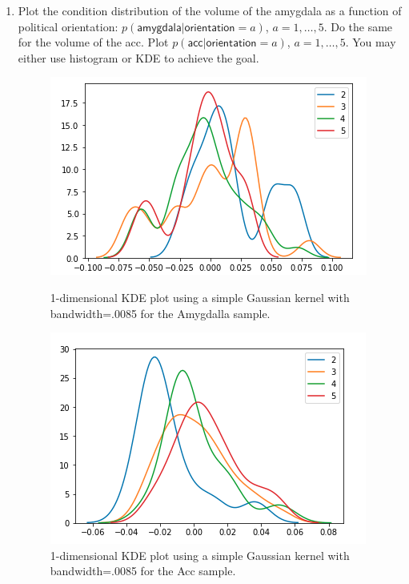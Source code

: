 \documentclass[twoside,10pt]{article}
\begin{document}
\begin{enumerate}
\begin{enumerate}
 \item Plot the condition distribution of the volume of the \textsf{amygdala} as a function of political \textsf{orientation}: $p(\textsf{amygdala}|\textsf{orientation}=a)$, $a = 1, \ldots, 5$. Do the same for the volume of the 
 \textsf{acc}. Plot $p(\textsf{acc}|\textsf{orientation}=a)$, $a = 1, \ldots, 5$. You may either use histogram or KDE to achieve the goal.
\begin{figure}[h]
  \centering
  \begin{minipage}[b]{0.4\textwidth}
    \includegraphics[width=\textwidth]{amyg.png}
    \caption{1-dimensional KDE plot using a simple Gaussian kernel with bandwidth=.0085 for the Amygdalla sample.}
  \end{minipage}
  \hfill
  \begin{minipage}[b]{0.4\textwidth}
    \includegraphics[width=\textwidth]{acc.png}
    \caption{1-dimensional KDE plot using a simple Gaussian kernel with bandwidth=.0085 for the Acc sample.}
  \end{minipage}
\end{figure}
 

\end{enumerate}
\end{enumerate}
\end{document}
